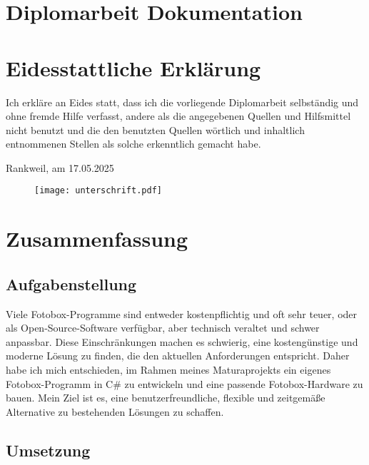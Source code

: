 \graphicspath{{images/general}}

\section{Diplomarbeit Dokumentation}

\newpage

\section{Eidesstattliche Erklärung}

Ich erkläre an Eides statt, dass ich die vorliegende Diplomarbeit selbständig
und ohne fremde Hilfe verfasst, andere als die angegebenen Quellen und
Hilfsmittel nicht benutzt und die den benutzten Quellen wörtlich und
inhaltlich entnommenen Stellen als solche erkenntlich gemacht habe.

\vspace{1cm}

Rankweil, am 17.05.2025

\begin{figure}[h!]
    \raggedleft
    \texttt{[image: unterschrift.pdf]}
\end{figure}

\newpage

\section{Zusammenfassung}

\subsection{Aufgabenstellung}

Viele Fotobox-Programme sind entweder kostenpflichtig und oft sehr teuer, oder 
als Open-Source-Software verfügbar, aber technisch veraltet und schwer anpassbar.
Diese Einschränkungen machen es schwierig, eine kostengünstige und moderne
Lösung zu finden, die den aktuellen Anforderungen entspricht.
Daher habe ich mich entschieden, im Rahmen meines Maturaprojekts ein eigenes
Fotobox-Programm in C\# zu entwickeln und eine passende Fotobox-Hardware zu bauen.
Mein Ziel ist es, eine benutzerfreundliche, flexible und zeitgemäße Alternative
zu bestehenden Lösungen zu schaffen.

\subsection{Umsetzung}

